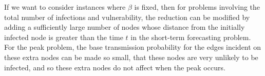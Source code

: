 \documentclass[11pt]{article}
\begin{document}
If we want to consider instances where $\beta$ is fixed,
then for problems involving the total number of infections and vulnerability,
the reduction can be modified by adding a sufficiently large number of nodes 
whose distance from the initially infected node is greater than the time $t$
in the short-term forecasting problem.
For the peak problem, 
the base transmission probability for the edges incident on these extra nodes can be made so small, 
that these nodes are very unlikely to be infected, 
and so these extra nodes do not affect when the peak occurs. 
\end{document}
